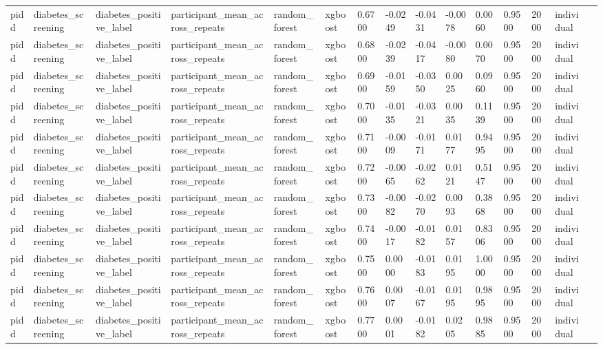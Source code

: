 \begin{tabular}{lllllllllllllll}
pidd & diabetes\_screening & diabetes\_positive\_label & participant\_mean\_across\_repeats & random\_forest & xgboost & 0.6700 & -0.0249 & -0.0431 & -0.0078 & 0.0060 & 0.9500 & 2000 & individual &  \\
pidd & diabetes\_screening & diabetes\_positive\_label & participant\_mean\_across\_repeats & random\_forest & xgboost & 0.6800 & -0.0239 & -0.0417 & -0.0080 & 0.0070 & 0.9500 & 2000 & individual &  \\
pidd & diabetes\_screening & diabetes\_positive\_label & participant\_mean\_across\_repeats & random\_forest & xgboost & 0.6900 & -0.0159 & -0.0350 & 0.0025 & 0.0960 & 0.9500 & 2000 & individual &  \\
pidd & diabetes\_screening & diabetes\_positive\_label & participant\_mean\_across\_repeats & random\_forest & xgboost & 0.7000 & -0.0135 & -0.0321 & 0.0035 & 0.1139 & 0.9500 & 2000 & individual &  \\
pidd & diabetes\_screening & diabetes\_positive\_label & participant\_mean\_across\_repeats & random\_forest & xgboost & 0.7100 & -0.0009 & -0.0171 & 0.0177 & 0.9495 & 0.9500 & 2000 & individual &  \\
pidd & diabetes\_screening & diabetes\_positive\_label & participant\_mean\_across\_repeats & random\_forest & xgboost & 0.7200 & -0.0065 & -0.0262 & 0.0121 & 0.5147 & 0.9500 & 2000 & individual &  \\
pidd & diabetes\_screening & diabetes\_positive\_label & participant\_mean\_across\_repeats & random\_forest & xgboost & 0.7300 & -0.0082 & -0.0270 & 0.0093 & 0.3868 & 0.9500 & 2000 & individual &  \\
pidd & diabetes\_screening & diabetes\_positive\_label & participant\_mean\_across\_repeats & random\_forest & xgboost & 0.7400 & -0.0017 & -0.0182 & 0.0157 & 0.8306 & 0.9500 & 2000 & individual &  \\
pidd & diabetes\_screening & diabetes\_positive\_label & participant\_mean\_across\_repeats & random\_forest & xgboost & 0.7500 & 0.0000 & -0.0183 & 0.0195 & 1.0000 & 0.9500 & 2000 & individual &  \\
pidd & diabetes\_screening & diabetes\_positive\_label & participant\_mean\_across\_repeats & random\_forest & xgboost & 0.7600 & 0.0007 & -0.0167 & 0.0195 & 0.9895 & 0.9500 & 2000 & individual &  \\
pidd & diabetes\_screening & diabetes\_positive\_label & participant\_mean\_across\_repeats & random\_forest & xgboost & 0.7700 & 0.0001 & -0.0182 & 0.0205 & 0.9885 & 0.9500 & 2000 & individual &  \\

\end{tabular}
